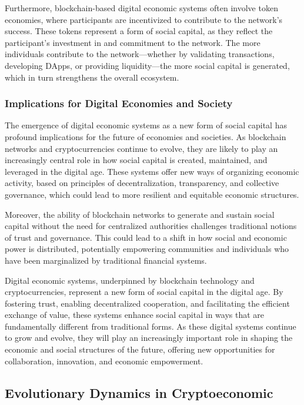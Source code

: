 \documentclass[12pt,twoside]{article}
\begin{document}
Furthermore, blockchain-based digital economic systems often involve token economies, where participants are incentivized to contribute to the network’s success. These tokens represent a form of social capital, as they reflect the participant's investment in and commitment to the network. The more individuals contribute to the network—whether by validating transactions, developing DApps, or providing liquidity—the more social capital is generated, which in turn strengthens the overall ecosystem.

\subsubsection{Implications for Digital Economies and Society}

The emergence of digital economic systems as a new form of social capital has profound implications for the future of economies and societies. As blockchain networks and cryptocurrencies continue to evolve, they are likely to play an increasingly central role in how social capital is created, maintained, and leveraged in the digital age. These systems offer new ways of organizing economic activity, based on principles of decentralization, transparency, and collective governance, which could lead to more resilient and equitable economic structures.

Moreover, the ability of blockchain networks to generate and sustain social capital without the need for centralized authorities challenges traditional notions of trust and governance. This could lead to a shift in how social and economic power is distributed, potentially empowering communities and individuals who have been marginalized by traditional financial systems.

Digital economic systems, underpinned by blockchain technology and cryptocurrencies, represent a new form of social capital in the digital age. By fostering trust, enabling decentralized cooperation, and facilitating the efficient exchange of value, these systems enhance social capital in ways that are fundamentally different from traditional forms. As these digital systems continue to grow and evolve, they will play an increasingly important role in shaping the economic and social structures of the future, offering new opportunities for collaboration, innovation, and economic empowerment.

\subsection{Evolutionary Dynamics in Cryptoeconomic}
\end{document}
